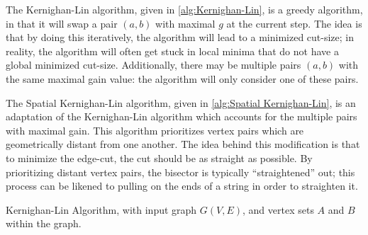{{{      The Kernighan-Lin algorithm, given in \cref{alg:Kernighan-Lin}, is a greedy algorithm, in that it will swap a pair $(a,b)$ with maximal $g$ at the current step.
      The idea is that by doing this iteratively, the algorithm will lead to a minimized cut-size; in reality, the algorithm will often get stuck in local minima that do not have a global minimized cut-size.
      Additionally, there may be multiple pairs $(a,b)$ with the same maximal gain value: the algorithm will only consider one of these pairs.

      The Spatial Kernighan-Lin algorithm, given in \cref{alg:Spatial Kernighan-Lin}, is an adaptation of the Kernighan-Lin algorithm which accounts for the multiple pairs with maximal gain.
      This algorithm prioritizes vertex pairs which are geometrically distant from one another.
      The idea behind this modification is that to minimize the edge-cut, the cut should be as straight as possible.
      By prioritizing distant vertex pairs, the bisector is typically ``straightened'' out; this process can be likened to pulling on the ends of a string in order to straighten it.

      \begin{algorithm}
        \centering
        \caption{Kernighan-Lin Algorithm, with input graph $G(V,E)$, and vertex sets $A$ and $B$ within the graph.}
        \label{alg:Kernighan-Lin}
        \begin{algorithmic}[1]
                \Else
                \EndIf
              \EndFor
              \EndIf
            \EndWhile
          \EndProcedure
        \end{algorithmic}
      \end{algorithm}

}}}
